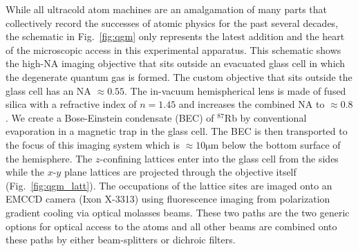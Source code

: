 While all ultracold atom machines are an amalgamation of many parts that collectively record the successes of atomic physics for the past several decades, the schematic in Fig.~\ref{fig:qgm} only represents the latest addition and the heart of the microscopic access in this experimental apparatus. This schematic shows the high-NA imaging objective that sits outside an evacuated glass cell in which the degenerate quantum gas is formed. The custom objective that sits outside the glass cell has an NA $\approx 0.55$. The in-vacuum hemispherical lens is made of fused silica with a refractive index of $n=1.45$ and increases the combined NA to $\approx 0.8$. We create a Bose-Einstein condensate (BEC) of $^{87}$Rb by conventional evaporation in a magnetic trap in the glass cell. The BEC is then transported to the focus of this imaging system which is $\approx 10\mathrm{\mu m}$ below the bottom surface of the hemisphere. The $z$-confining lattices enter into the glass cell from the sides while the $x$-$y$ plane lattices are projected through the objective itself (Fig.~\ref{fig:qgm_latt}). The occupations of the lattice sites are imaged onto an EMCCD camera (Ixon X-3313) using fluorescence imaging from polarization gradient cooling via optical molasses beams. These two paths are the two generic options for optical access to the atoms and all other beams are combined onto these paths by either beam-splitters or dichroic filters.


